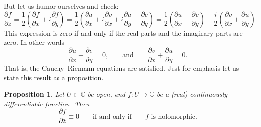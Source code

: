 \documentclass[12pt,openany]{book}
\newcommand{\C}{{\mathbb{C}}}
\theoremstyle{plain}
\newtheorem{prop}[thm]{Proposition}
\theoremstyle{remark}
\theoremstyle{definition}
\theoremstyle{exercise}
\theoremstyle{example}
\begin{document}
But let us humor ourselves and check:
\begin{equation*}
\frac{\partial f}{\partial \bar{z}} 
=
\frac{1}{2}
\left(
\frac{\partial f}{\partial x} + i
\frac{\partial f}{\partial y}
\right)
=
\frac{1}{2}
\left(
\frac{\partial u}{\partial x} 
+ i \frac{\partial v}{\partial x} 
+ i \frac{\partial u}{\partial y}
- \frac{\partial v}{\partial y}
\right) 
=
\frac{1}{2}
\left(
\frac{\partial u}{\partial x} 
- \frac{\partial v}{\partial y}
\right)
+
\frac{i}{2}
\left(
\frac{\partial v}{\partial x} 
+ \frac{\partial u}{\partial y}
\right) .
\end{equation*}
This expression is zero if and only if the real parts and the imaginary
parts are zero.  In other words
\begin{equation*}
\frac{\partial u}{\partial x} 
- \frac{\partial v}{\partial y}
= 0,
\qquad
\text{and}
\qquad
\frac{\partial v}{\partial x} 
+ \frac{\partial u}{\partial y} = 0
.
\end{equation*}
That is, the Cauchy--Riemann equations are satisfied.  Just for emphasis
let us state this result as a proposition.

\begin{prop}
\label{prop:WirtCR}
Let $U \subset \C$ be open, and $f \colon U \to \C$ be a (real) continuously
differentiable function.
Then
\begin{equation*}
\frac{\partial f}{\partial \bar{z}} \equiv 0
\qquad
\text{if and only if}
\qquad
f \text{ is holomorphic.}
\end{equation*}
\end{prop}


\medskip
\end{document}
